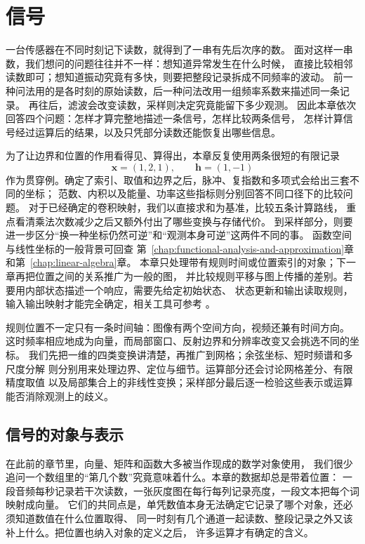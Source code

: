 \chapter{信号}
\label{chap:signal-analysis}

一台传感器在不同时刻记下读数，就得到了一串有先后次序的数。
面对这样一串数，我们想问的问题往往并不一样：想知道异常发生在什么时候，
直接比较相邻读数即可；想知道振动究竟有多快，则要把整段记录拆成不同频率的波动。
前一种问法用的是各时刻的原始读数，后一种问法改用一组频率系数来描述同一条记录。
再往后，滤波会改变读数，采样则决定究竟能留下多少观测。
因此本章依次回答四个问题：怎样才算完整地描述一条信号，怎样比较两条信号，
怎样计算信号经过运算后的结果，以及只凭部分读数还能恢复出哪些信息。

为了让边界和位置的作用看得见、算得出，本章反复使用两条很短的有限记录
\begin{equation}
  \bm x=(1,2,1),\qquad \bm h=(1,-1)
  \label{eq:signal-analysis-running-example}
\end{equation}
作为贯穿例。确定了索引、取值和边界之后，脉冲、复指数和多项式会给出三套不同的坐标；
范数、内积以及能量、功率这些指标则分别回答不同口径下的比较问题。
对于已经确定的卷积映射，我们以直接求和为基准，比较五条计算路线，
重点看清乘法次数减少之后又额外付出了哪些变换与存储代价。
到采样部分，则要进一步区分“换一种坐标仍然可逆”和“观测本身可逆”这两件不同的事。
函数空间与线性坐标的一般背景可回查
第~\ref{chap:functional-analysis-and-approximation}章和第~\ref{chap:linear-algebra}章。
本章只处理带有规则时间或位置索引的对象；下一章再把位置之间的关系推广为一般的图，
并比较规则平移与图上传播的差别。若要用内部状态描述一个响应，需要先给定初始状态、
状态更新和输出读取规则，输入输出映射才能完全确定，相关工具可参考
。

规则位置不一定只有一条时间轴：图像有两个空间方向，视频还兼有时间方向。
这时频率相应地成为向量，而局部窗口、反射边界和分辨率改变又会挑选不同的坐标。
我们先把一维的四类变换讲清楚，再推广到网格；余弦坐标、短时频谱和多尺度分解
则分别用来处理边界、定位与细节。运算部分还会讨论网格差分、有限精度取值
以及局部集合上的非线性变换；采样部分最后逐一检验这些表示或运算能否消除观测上的歧义。

\section{信号的对象与表示}
\label{sec:signal-objects-structure}

在此前的章节里，向量、矩阵和函数大多被当作现成的数学对象使用，
我们很少追问一个数组里的“第几个数”究竟意味着什么。本章的数据却总是带着位置：
一段音频每秒记录若干次读数，一张灰度图在每行每列记录亮度，一段文本把每个词映射成向量。
它们的共同点是，单凭数值本身无法确定它记录了哪个对象，还必须知道数值在什么位置取得、
同一时刻有几个通道一起读数、整段记录之外又该补上什么。把位置也纳入对象的定义之后，
许多运算才有确定的含义。

